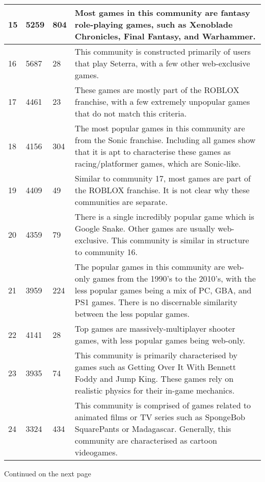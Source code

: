 \begin{table}
\begin{tabular}{
        |p{}
        |p{}
        |p{}
        |p{}|}
        15 & 5259 & 804 & Most games in this community are fantasy role-playing games, such as Xenoblade Chronicles, Final Fantasy, and Warhammer.\\ \hline
        16 & 5687 & 28 & This community is constructed primarily of users that play Seterra, with a few other web-exclusive games.\\ \hline
        17 & 4461 & 23 & These games are mostly part of the ROBLOX franchise, with a few extremely unpopular games that do not match this criteria.\\ \hline
        18 & 4156 & 304 & The most popular games in this community are from the Sonic franchise. Including all games show that it is apt to characterise these games as racing/platformer games, which are Sonic-like. \\ \hline
        19 & 4409 & 49 & Similar to community 17, most games are part of the ROBLOX franchise. It is not clear why these communities are separate. \\ \hline
        20 & 4359 & 79 & There is a single incredibly popular game which is Google Snake. Other games are usually web-exclusive. This community is similar in structure to community 16. \\ \hline
        21 & 3959 & 224 & The popular games in this community are web-only games from the 1990's to the 2010's, with the less popular games being a mix of PC, GBA, and PS1 games. There is no discernable similarity between the less popular games.\\ \hline
        22 & 4141 & 28 & Top games are massively-multiplayer shooter games, with less popular games being web-only.\\ \hline
        23 & 3935 & 74 & This community is primarily characterised by games such as Getting Over It With Bennett Foddy and Jump King. These games rely on realistic physics for their in-game mechanics. \\ \hline
        24 & 3324 & 434 & This community is comprised of games related to animated films or TV series such as SpongeBob SquarePants or Madagascar. Generally, this community are characterised as cartoon videogames. \\ \hline
    \end{tabular}
    \label{tab:appendix}
    \begin{flushright}
        Continued on the next page
    \end{flushright}
\end{table}


